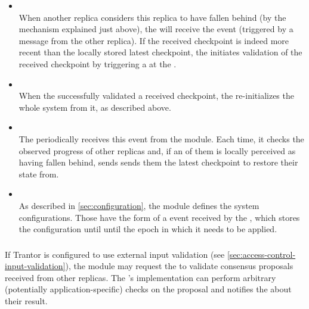 \documentclass{article}
\begin{document}
\begin{itemize}
    \item {}\\
    When another replica considers this replica to have fallen behind (by the mechanism explained just above),
    the  will receive the  event
    (triggered by a message from the other replica).
    If the received checkpoint is indeed more recent than the locally stored latest checkpoint,
    the  initiates validation of the received checkpoint
    by triggering a  at the .

    \item {}\\
    When the  successfully validated a received checkpoint,
    the  re-initializes the whole system from it, as described above.

    \item {}\\
    The  periodically receives this event from the  module.
    Each time, it checks the observed progress of other replicas and,
    if an of them is locally perceived as having fallen behind,
    sends sends them the latest checkpoint to restore their state from.

    \item {}\\
    As described in \cref{sec:configuration}, the  module defines the system configurations.
    Those have the form of a  event received by the ,
    which stores the configuration until until the epoch in which it needs to be applied.

\end{itemize}

\subsubsection{}
\label{sec:module-proposal-validator}

If Trantor is configured to use external input validation (see \cref{sec:access-control-input-validation}),
the  module may request the  to validate consensus proposals received from other replicas.
The 's implementation can perform arbitrary (potentially application-specific) checks on the proposal
and notifies the  about their result.
\end{document}
